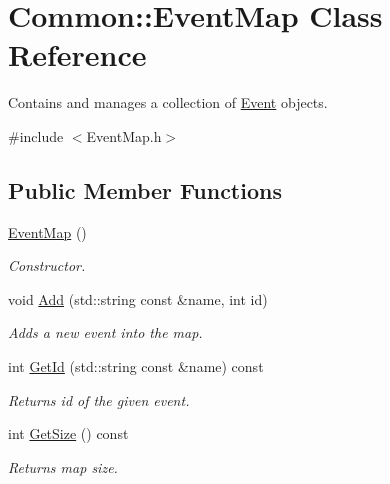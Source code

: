 \hypertarget{class_common_1_1_event_map}{\section{Common\-:\-:Event\-Map Class Reference}
\label{class_common_1_1_event_map}
}


Contains and manages a collection of \hyperlink{class_common_1_1_event}{Event} objects.  




{\ttfamily \#include $<$Event\-Map.\-h$>$}

\subsection*{Public Member Functions}
\begin{DoxyCompactItemize}
\item 
\hypertarget{class_common_1_1_event_map_a2ecd4953116dbcc2fa41cb3197154e05}{\hyperlink{class_common_1_1_event_map_a2ecd4953116dbcc2fa41cb3197154e05}{Event\-Map} ()}\label{class_common_1_1_event_map_a2ecd4953116dbcc2fa41cb3197154e05}

\begin{DoxyCompactList}\small\item\em Constructor. \end{DoxyCompactList}\item 
void \hyperlink{class_common_1_1_event_map_a4cc364f80ededaab7215e0de7df690a5}{Add} (std\-::string const \&name, int id)
\begin{DoxyCompactList}\small\item\em Adds a new event into the map. \end{DoxyCompactList}\item 
int \hyperlink{class_common_1_1_event_map_a3f3e9ec582e4cccdca6f12ac70d181f8}{Get\-Id} (std\-::string const \&name) const 
\begin{DoxyCompactList}\small\item\em Returns id of the given event. \end{DoxyCompactList}\item 
\hypertarget{class_common_1_1_event_map_a4de4e93e992b4beb406b164c23ed4ea9}{int \hyperlink{class_common_1_1_event_map_a4de4e93e992b4beb406b164c23ed4ea9}{Get\-Size} () const }\label{class_common_1_1_event_map_a4de4e93e992b4beb406b164c23ed4ea9}

\begin{DoxyCompactList}\small\item\em Returns map size. \end{DoxyCompactList}\end{DoxyCompactItemize}


